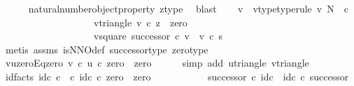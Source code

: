 \begin{isabellebody}
\ \ \ \ \isamarkupfalse%
\ natural{\isacharunderscore}{\kern0pt}number{\isacharunderscore}{\kern0pt}object{\isacharunderscore}{\kern0pt}property\ z{\isacharunderscore}{\kern0pt}type\ \isamarkupfalse%
\ blast\isanewline
\ \ \isamarkupfalse%
\ v\ \ v{\isacharunderscore}{\kern0pt}type{\isacharbrackleft}{\kern0pt}type{\isacharunderscore}{\kern0pt}rule{\isacharbrackright}{\kern0pt}{\isacharcolon}{\kern0pt}\ {\isachardoublequoteopen}v{\isacharcolon}{\kern0pt}\ N\ {\isasymrightarrow}\ {\isasymnat}\isactrlsub c{\isachardoublequoteclose}\ \isanewline
\ \ \ \ \ \ \ \ \ \ \ \ \ \ \ \ \ \ \ v{\isacharunderscore}{\kern0pt}triangle{\isacharcolon}{\kern0pt}\ {\isachardoublequoteopen}v\ {\isasymcirc}\isactrlsub c\ z\ {\isacharequal}{\kern0pt}\ zero{\isachardoublequoteclose}\ \isanewline
\ \ \ \ \ \ \ \ \ \ \ \ \ \ \ \ \ \ \ v{\isacharunderscore}{\kern0pt}square{\isacharcolon}{\kern0pt}\ {\isachardoublequoteopen}successor\ {\isasymcirc}\isactrlsub c\ v\ {\isacharequal}{\kern0pt}\ v\ {\isasymcirc}\isactrlsub c\ s{\isachardoublequoteclose}\isanewline
\ \ \ \ \isamarkupfalse%
\ {\isacharparenleft}{\kern0pt}metis\ assms\ is{\isacharunderscore}{\kern0pt}NNO{\isacharunderscore}{\kern0pt}def\ successor{\isacharunderscore}{\kern0pt}type\ zero{\isacharunderscore}{\kern0pt}type{\isacharparenright}{\kern0pt}\isanewline
\ \ \isamarkupfalse%
\ \isamarkupfalse%
\ vuzeroEqzero{\isacharcolon}{\kern0pt}\ {\isachardoublequoteopen}v\ {\isasymcirc}\isactrlsub c\ {\isacharparenleft}{\kern0pt}u\ {\isasymcirc}\isactrlsub c\ zero{\isacharparenright}{\kern0pt}\ {\isacharequal}{\kern0pt}\ zero{\isachardoublequoteclose}\isanewline
\ \ \ \ \isamarkupfalse%
\ {\isacharparenleft}{\kern0pt}simp\ add{\isacharcolon}{\kern0pt}\ u{\isacharunderscore}{\kern0pt}triangle\ v{\isacharunderscore}{\kern0pt}triangle{\isacharparenright}{\kern0pt}\isanewline
\ \ \isamarkupfalse%
\ id{\isacharunderscore}{\kern0pt}facts{}{\isacharcolon}{\kern0pt}\ {\isachardoublequoteopen}id{\isacharparenleft}{\kern0pt}{\isasymnat}\isactrlsub c{\isacharparenright}{\kern0pt}{\isacharcolon}{\kern0pt}\ {\isasymnat}\isactrlsub c\ {\isasymrightarrow}\ {\isasymnat}\isactrlsub c{\isasymand}\ id{\isacharparenleft}{\kern0pt}{\isasymnat}\isactrlsub c{\isacharparenright}{\kern0pt}\ {\isasymcirc}\isactrlsub c\ zero\ {\isacharequal}{\kern0pt}\ zero\ {\isasymand}\isanewline
\ \ \ \ \ \ \ \ \ \ {\isacharparenleft}{\kern0pt}successor\ {\isasymcirc}\isactrlsub c\ id{\isacharparenleft}{\kern0pt}{\isasymnat}\isactrlsub c{\isacharparenright}{\kern0pt}\ {\isacharequal}{\kern0pt}\ id{\isacharparenleft}{\kern0pt}{\isasymnat}\isactrlsub c{\isacharparenright}{\kern0pt}\ {\isasymcirc}\isactrlsub c\ successor{\isacharparenright}{\kern0pt}{\isachardoublequoteclose}\isanewline

\end{isabellebody}
